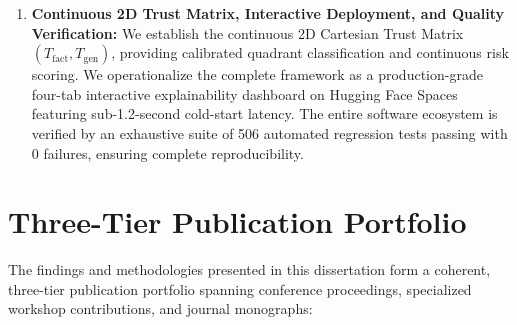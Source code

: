 \begin{enumerate}
    \item \textbf{Continuous 2D Trust Matrix, Interactive Deployment, and Quality Verification:} We establish the continuous 2D Cartesian Trust Matrix $(T_{\text{fact}}, T_{\text{gen}})$, providing calibrated quadrant classification and continuous risk scoring. We operationalize the complete framework as a production-grade four-tab interactive explainability dashboard on Hugging Face Spaces featuring sub-1.2-second cold-start latency. The entire software ecosystem is verified by an exhaustive suite of 506 automated regression tests passing with 0 failures, ensuring complete reproducibility.
\end{enumerate}

\section{Three-Tier Publication Portfolio}
\label{sec:intro_publications}

The findings and methodologies presented in this dissertation form a coherent, three-tier publication portfolio spanning conference proceedings, specialized workshop contributions, and journal monographs:

